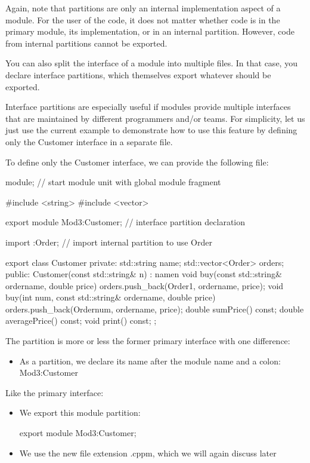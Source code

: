Again, note that partitions are only an internal implementation aspect of a module. For the user of the code, it does not matter whether code is in the primary module, its implementation, or in an internal partition. However, code from internal partitions cannot be exported.


You can also split the interface of a module into multiple files. In that case, you declare interface partitions, which themselves export whatever should be exported.

Interface partitions are especially useful if modules provide multiple interfaces that are maintained by different programmers and/or teams. For simplicity, let us just use the current example to demonstrate how to use this feature by defining only the Customer interface in a separate file.

To define only the Customer interface, we can provide the following file:


\begin{cpp}
module; // start module unit with global module fragment

#include <string>
#include <vector>

export module Mod3:Customer; // interface partition declaration

import :Order; // import internal partition to use Order

export class Customer {
private:
	std::string name;
	std::vector<Order> orders;
public:
	Customer(const std::string& n)
	: name{n} {
	}
	void buy(const std::string& ordername, double price) {
		orders.push_back(Order{1, ordername, price});
	}
	void buy(int num, const std::string& ordername, double price) {
		orders.push_back(Order{num, ordername, price});
	}
	double sumPrice() const;
	double averagePrice() const;
	void print() const;
};
\end{cpp}

The partition is more or less the former primary interface with one difference:

\begin{itemize}
\item 
As a partition, we declare its name after the module name and a colon: Mod3:Customer
\end{itemize}

Like the primary interface:

\begin{itemize}
\item 
We export this module partition:

\begin{cpp}
export module Mod3:Customer;
\end{cpp}

\item 
We use the new file extension .cppm, which we will again discuss later
\end{itemize}

